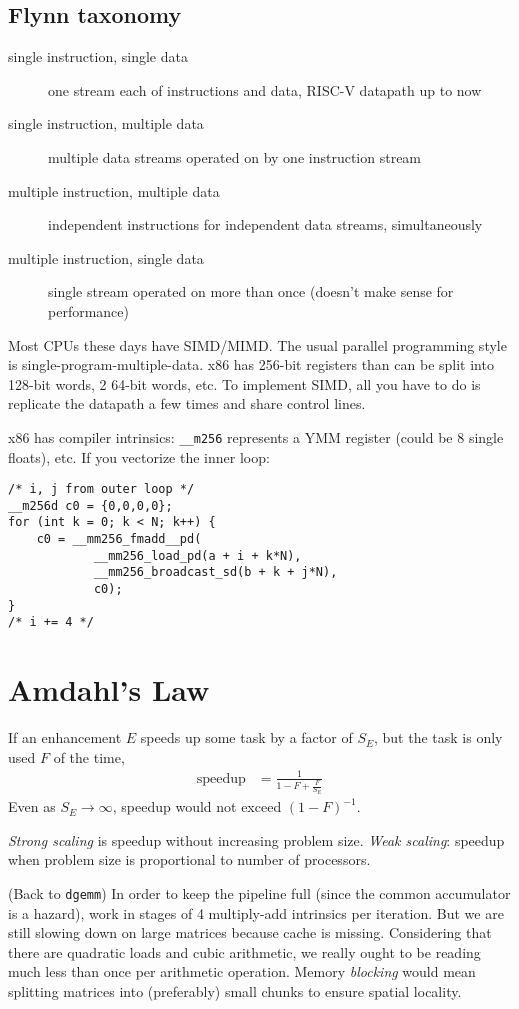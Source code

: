 \subsection{Flynn taxonomy}
\begin{description}
	\item[single instruction, single data] one stream each of instructions and data, RISC-V datapath up to now
	\item[single instruction, multiple data] multiple data streams operated on by one instruction stream
	\item[multiple instruction, multiple data] independent instructions for independent data streams, simultaneously
	\item[multiple instruction, single data] single stream operated on more than once (doesn't make sense for performance)
\end{description}
Most CPUs these days have SIMD/MIMD. The usual parallel programming style is single-program-multiple-data.
%
x86 has 256-bit registers than can be split into 128-bit words, 2 64-bit words, etc.
To implement SIMD, all you have to do is replicate the datapath a few times and share control lines.

x86 has compiler intrinsics: \texttt{\_\_m256} represents a YMM register (could be 8 single floats), etc.
If you vectorize the inner loop:
\begin{verbatim}
/* i, j from outer loop */
__m256d c0 = {0,0,0,0};
for (int k = 0; k < N; k++) {
	c0 = __mm256_fmadd__pd(
			__mm256_load_pd(a + i + k*N),
			__mm256_broadcast_sd(b + k + j*N),
			c0);
}
/* i += 4 */
\end{verbatim}

\section{Amdahl's Law}
If an enhancement \(E\) speeds up some task by a factor of \(S_E\), but the task is only used \(F\) of the time,
\begin{align}
	\text{speedup} &=  \frac{1}{1 - F + \frac{F}{S_E}}
\end{align}
Even as \(S_E\to\infty\), speedup would not exceed \(\left(1 - F\right)^{-1}\).

\emph{Strong scaling} is speedup without increasing problem size. \emph{Weak scaling}: speedup when problem size is proportional to number of processors.

(Back to \texttt{dgemm})
In order to keep the pipeline full (since the common accumulator is a hazard), work in stages of 4 multiply-add intrinsics per iteration.
But we are still slowing down on large matrices because cache is missing.
Considering that there are quadratic loads and cubic arithmetic, we really ought to be reading much less than once
per arithmetic operation. Memory \emph{blocking} would mean splitting matrices into (preferably) small chunks to ensure spatial locality.